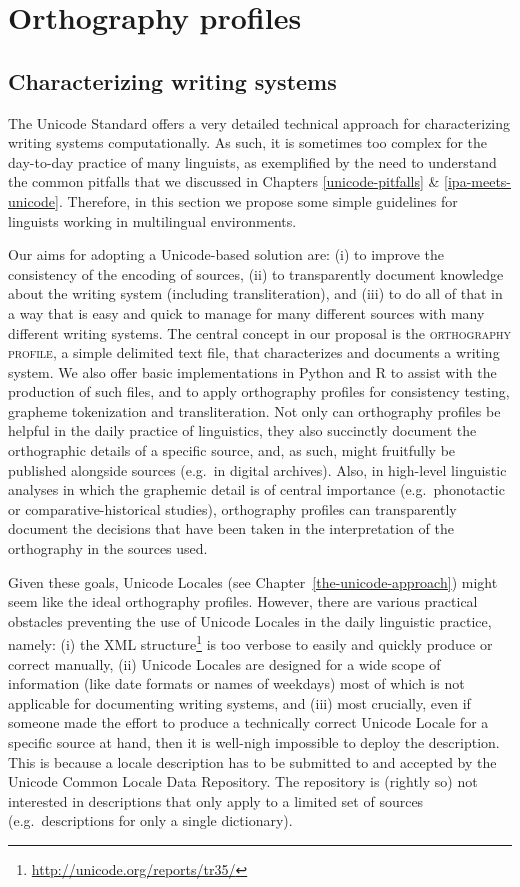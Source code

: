 \chapter{Orthography profiles}
\label{orthography-profiles}

\section{Characterizing writing systems}
\label{characterizing-writing-systems}

The Unicode Standard offers a very detailed technical approach 
for characterizing writing systems computationally. As such, it is 
sometimes too complex for the day-to-day practice of many linguists, 
as exemplified by the need to understand the common pitfalls that we discussed in Chapters 
\ref{unicode-pitfalls} \& \ref{ipa-meets-unicode}. Therefore, in this section we propose some simple 
guidelines for linguists working in multilingual environments.

Our aims for adopting a Unicode-based
solution are: (i) to improve the consistency of the encoding of sources, (ii)
to transparently document knowledge about the writing system (including
transliteration), and (iii) to do all of that in a way that is easy and quick to
manage for many different sources with many different writing systems. The
central concept in our proposal is the \textsc{orthography profile}, a simple
delimited text file, that characterizes and documents a writing system.
We also offer basic implementations in Python and R to assist with the
production of such files, and to apply orthography profiles for consistency
testing, grapheme tokenization and transliteration. Not only can orthography
profiles be helpful in the daily practice of linguistics, they also succinctly
document the orthographic details of a specific source, and, as such, might
fruitfully be published alongside sources (e.g.~in digital archives). Also, in
high-level linguistic analyses in which the graphemic detail is of central
importance (e.g.~phonotactic or comparative-historical studies), orthography
profiles can transparently document the decisions that have been taken in the
interpretation of the orthography in the sources used.

Given these goals, Unicode Locales (see
Chapter~\ref{the-unicode-approach}) might seem like the ideal orthography
profiles. However, there are various practical obstacles preventing the use of
Unicode Locales in the daily linguistic practice, namely: (i) the
XML structure\footnote{\url{http://unicode.org/reports/tr35/}} is too verbose to easily and quickly produce or correct manually,
(ii) Unicode Locales are designed for a wide scope of information (like date
formats or names of weekdays) most of which is not applicable for documenting
writing systems, and (iii) most crucially, even if someone made the effort to
produce a technically correct Unicode Locale for a specific source at hand,
then it is well-nigh impossible to deploy the description. This is because a locale
description has to be submitted to and accepted by the Unicode Common Locale
Data Repository. The repository is (rightly so) not interested in descriptions
that only apply to a limited set of sources (e.g.~descriptions for only a single
dictionary).

